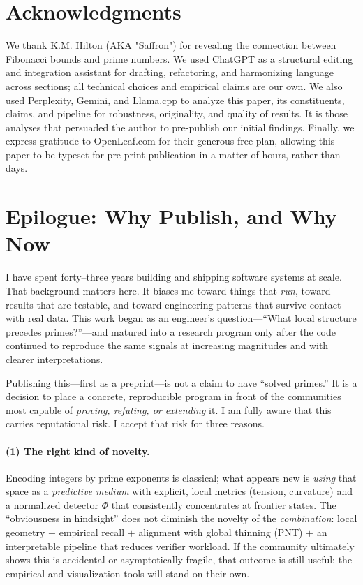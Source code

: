 \documentclass[11pt]{article}
\theoremstyle{plain}
\theoremstyle{definition}
\begin{document}
\section*{Acknowledgments}
We thank K.M. Hilton (AKA "Saffron") for revealing the connection between Fibonacci bounds and prime numbers.  We used ChatGPT as a structural editing and integration assistant for drafting, refactoring, and harmonizing language across sections; all technical choices and empirical claims are our own.  We also used Perplexity, Gemini, and Llama.cpp to analyze this paper, its constituents, claims, and pipeline for robustness, originality, and quality of results.  It is those analyses that persuaded the author to pre-publish our initial findings. Finally, we express gratitude to OpenLeaf.com for their generous free plan, allowing this paper to be typeset for pre-print publication in a matter of hours, rather than days.  

\section*{Epilogue: Why Publish, and Why Now}

I have spent forty–three years building and shipping software systems at scale. That background matters here. It biases me toward things that \emph{run}, toward results that are testable, and toward engineering patterns that survive contact with real data. This work began as an engineer’s question—“What local structure precedes primes?”—and matured into a research program only after the code continued to reproduce the same signals at increasing magnitudes and with clearer interpretations.

Publishing this—first as a preprint—is not a claim to have “solved primes.” It is a decision to place a concrete, reproducible program in front of the communities most capable of \emph{proving, refuting, or extending} it. I am fully aware that this carries reputational risk. I accept that risk for three reasons.

\paragraph{(1) The right kind of novelty.}
Encoding integers by prime exponents is classical; what appears new is \emph{using} that space as a \emph{predictive medium} with explicit, local metrics (tension, curvature) and a normalized detector $\Phi$ that consistently concentrates at frontier states. The “obviousness in hindsight” does not diminish the novelty of the \emph{combination}: local geometry $+$ empirical recall $+$ alignment with global thinning (PNT) $+$ an interpretable pipeline that reduces verifier workload. If the community ultimately shows this is accidental or asymptotically fragile, that outcome is still useful; the empirical and visualization tools will stand on their own.
\end{document}
